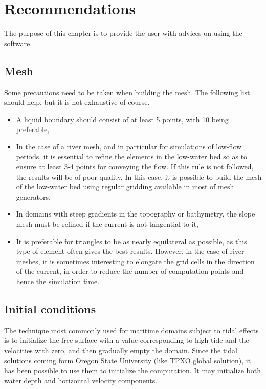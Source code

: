 \chapter{Recommendations}
\label{ch:reccom}
The purpose of this chapter is to provide the user with advices on using the
software.
\section{Mesh}

Some precautions need to be taken when building the mesh.
The following list should help, but it is not exhaustive of course.

\begin{itemize}
\item A liquid boundary should consist of at least 5 points, with 10 being
preferable,

\item In the case of a river mesh, and in particular for simulations of
low-flow periods, it is essential to refine the elements in the low-water bed
so as to ensure at least 3-4 points for conveying the flow.
If this rule is not followed, the results will be of poor quality.
In this case, it is possible to build the mesh of the low-water bed using
regular gridding available in most of mesh generators,

\item In domains with steep gradients in the topography or bathymetry,
the slope mesh must be refined if the current is not tangential to it,

\item It is preferable for triangles to be as nearly equilateral as possible,
as this type of element often gives the best results.
However, in the case of river meshes, it is sometimes interesting to elongate
the grid cells in the direction of the current, in order to reduce
the number of computation points and hence the simulation time.
\end{itemize}


\section{Initial conditions}

The technique most commonly used for maritime domains subject to tidal effects
is to initialize the free surface with a value corresponding to high tide
and the velocities with zero, and then gradually empty the domain.
Since the tidal solutions coming form Oregon State University (like TPXO global
solution), it has been possible to use them to initialize the computation.
It may initialize both water depth and horizontal velocity components.

